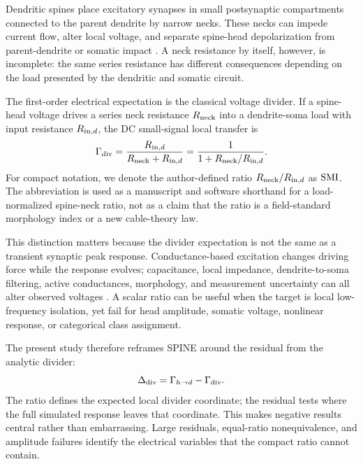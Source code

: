 Dendritic spines place excitatory synapses in small postsynaptic compartments connected to the parent dendrite by narrow necks. These necks can impede current flow, alter local voltage, and separate spine-head depolarization from parent-dendrite or somatic impact \citep{Rall1964,SegevRall1988,TsayYuste2004,Yuste2013,Araya2006,Harnett2012SpineAmplification,Kwon2017,BeaulieuLarocheHarnett2018,Cornejo2022}. A neck resistance by itself, however, is incomplete: the same series resistance has different consequences depending on the load presented by the dendritic and somatic circuit.

The first-order electrical expectation is the classical voltage divider. If a spine-head voltage drives a series neck resistance $R_{\mathrm{neck}}$ into a dendrite-soma load with input resistance $R_{\mathrm{in},d}$, the DC small-signal local transfer is
\begin{equation}
\Gamma_{\mathrm{div}}=\frac{R_{\mathrm{in},d}}{R_{\mathrm{neck}}+R_{\mathrm{in},d}}=\frac{1}{1+R_{\mathrm{neck}}/R_{\mathrm{in},d}}.
\end{equation}
For compact notation, we denote the author-defined ratio $R_{\mathrm{neck}}/R_{\mathrm{in},d}$ as $\mathrm{SMI}$. The abbreviation is used as a manuscript and software shorthand for a load-normalized spine-neck ratio, not as a claim that the ratio is a field-standard morphology index or a new cable-theory law.

This distinction matters because the divider expectation is not the same as a transient synaptic peak response. Conductance-based excitation changes driving force while the response evolves; capacitance, local impedance, dendrite-to-soma filtering, active conductances, morphology, and measurement uncertainty can all alter observed voltages \citep{Magee2000Review,LondonHausser2005,StuartSpruston2015,Popovic2015,Zecevic2023}. A scalar ratio can be useful when the target is local low-frequency isolation, yet fail for head amplitude, somatic voltage, nonlinear response, or categorical class assignment.

The present study therefore reframes SPINE around the residual from the analytic divider:
\begin{equation}
\Delta_{\mathrm{div}}=\Gamma_{h\rightarrow d}-\Gamma_{\mathrm{div}}.
\end{equation}
The ratio defines the expected local divider coordinate; the residual tests where the full simulated response leaves that coordinate. This makes negative results central rather than embarrassing. Large residuals, equal-ratio nonequivalence, and amplitude failures identify the electrical variables that the compact ratio cannot contain.

